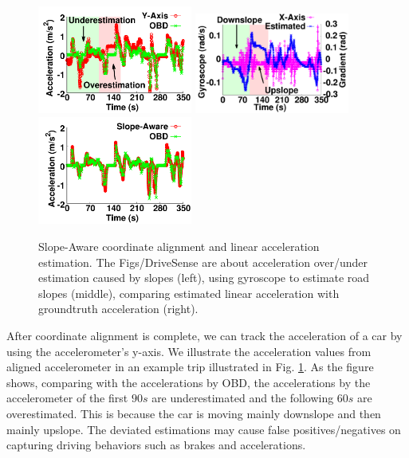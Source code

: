 \begin{figure}[t]
\begin{center}
\includegraphics[width=2.0in,angle=0]{Figs/DriveSense/slopeaware/accspeed.pdf}
\hspace{-0.0cm}
\includegraphics[width=2.0in,angle=0]{Figs/DriveSense/slopeaware/gyrocompare.pdf}
\hspace{-0.0cm}
\includegraphics[width=2.0in,angle=0]{Figs/DriveSense/slopeaware/acccompare.pdf}
\hspace{-0.0cm}
\vspace{-0.2cm}
\caption{Slope-Aware coordinate alignment and linear acceleration estimation. 
The Figs/DriveSense are about acceleration over/under estimation caused by slopes (left), 
using gyroscope to estimate road slopes (middle), 
comparing estimated linear acceleration with groundtruth acceleration (right).}
\vspace{-0.2cm}
\label{linear_acceleration}
\end{center}
\end{figure}


After coordinate alignment is complete, 
we can track the acceleration of a car by using the accelerometer's y-axis. 
We illustrate the acceleration values from aligned accelerometer 
in an example trip illustrated in Fig. \ref{linear_acceleration}. 
As the figure shows, comparing with the accelerations by OBD,   
the accelerations by the accelerometer of the first $90s$ 
are underestimated and the following $60s$ are overestimated.
This is because the car is moving mainly downslope and then mainly upslope. 
The deviated estimations may cause false positives/negatives on 
capturing driving behaviors such as brakes and accelerations.

